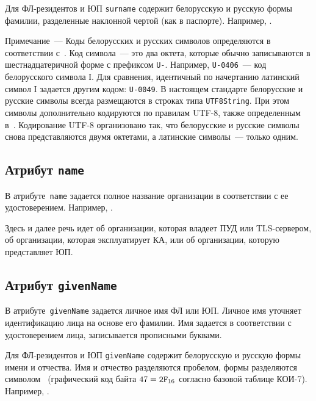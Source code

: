 Для ФЛ-резидентов и ЮП \texttt{surname} содержит белорусскую и русскую 
формы фамилии, разделенные наклонной чертой (как в паспорте).
Например, .


\begin{note} 
Примечание~--- Коды белорусских и русских символов определяются 
в соответствии с~\cite{UTF8}. Код символа~--- это два октета,
которые обычно записываются в шестнадцатеричной форме с префиксом
\texttt{U-}. Например, \texttt{U-0406}~--- код белорусского символа І.
Для сравнения, идентичный по начертанию латинский символ I 
задается другим кодом: \texttt{U-0049}.
%
В настоящем стандарте белорусские и русские символы 
всегда размещаются в строках типа \texttt{UTF8String}.
%
При этом символы дополнительно кодируются по правилам UTF-8, также 
определенным в~\cite{UTF8}. Кодирование UTF-8 организовано так, что 
белорусские и русские символы снова представляются двумя октетами, 
а латинские символы~--- только одним.
\end{note}

\subsection{Атрибут \texttt{name}}\label{ENTITIES.Id.N}

В атрибуте~\texttt{name} задается полное название организации
в соответствии с ее удостоверением. Например, .  

Здесь и далее речь идет об организации,
которая владеет ПУД или TLS-сервером, 
об организации, которая эксплуатирует КА,
или об организации, которую представляет ЮП.

\subsection{Атрибут \texttt{givenName}}\label{ENTITIES.Id.GN}

В атрибуте~\texttt{givenName} задается личное имя ФЛ или ЮП.
Личное имя уточняет идентификацию лица на основе его фамилии.
%
Имя задается в соответствии с удостоверением лица, 
записывается прописными буквами. 

Для ФЛ-резидентов и ЮП \texttt{givenName} содержит белорусскую и русскую 
формы имени и отчества. Имя и отчество разделяются пробелом, формы 
разделяются символом~\str{/} (графический код байта $47=\texttt{2F}_{16}$ 
согласно базовой таблице КОИ-7). 
Например, .

